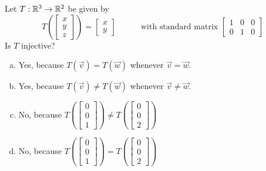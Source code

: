 \begin{activity}{3}
Let $T: \mathbb{R}^3 \rightarrow \mathbb{R}^2$ be given by
\[
  T\left(\begin{bmatrix}x \\ y\\z \end{bmatrix} \right)
    =
  \begin{bmatrix} x \\ y \end{bmatrix}
    \hspace{3em}
    \text{with standard matrix }
  \begin{bmatrix} 1 & 0 & 0 \\ 0 & 1 & 0 \end{bmatrix}
\]
Is \(T\) injective?
\begin{enumerate}[a)]
\item Yes, because \(T(\vec v)=T(\vec w)\) whenever \(\vec v=\vec w\).
\item Yes, because \(T(\vec v)\not=T(\vec w)\) whenever \(\vec v\not=\vec w\).
\item No, because 
  \(
    T\left(\begin{bmatrix}0\\0\\1\end{bmatrix}\right)
      \not=
    T\left(\begin{bmatrix}0\\0\\2\end{bmatrix}\right)
  \)
\item No, because 
  \(
    T\left(\begin{bmatrix}0\\0\\1\end{bmatrix}\right)
      =
    T\left(\begin{bmatrix}0\\0\\2\end{bmatrix}\right)
  \)
\end{enumerate}
\end{activity}

